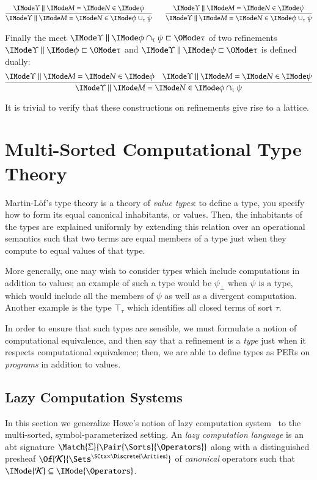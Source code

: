 \documentclass[11pt]{article}
\theoremstyle{definition}
\theoremstyle{notation}
\theoremstyle{remark}
\numberwithin{equation}{section}
\newcommand\IsSubsetEq[2]{\IMode{#1}\subseteq\IMode{#2}}
\newcommand\CanOperators{\mathcal{K}}
\newcommand\TyTop[1]{\top_{#1}}
\newcommand\TyMeet[1]{\cap_{#1}}
\newcommand\TyJoin[1]{\cup_{#1}}
\begin{document}
\begin{gather*}
  \infer{
    \RMemEq{\Upsilon}{M}{N}{\phi\TyJoin{\tau}\psi}
  }{
    \RMemEq{\Upsilon}{M}{N}{\phi}
  }\qquad
  \infer{
    \RMemEq{\Upsilon}{M}{N}{\phi\TyJoin{\tau}\psi}
  }{
    \RMemEq{\Upsilon}{M}{N}{\psi}
  }
\end{gather*}

Finally the meet $\Refines{\Upsilon}{\phi\TyMeet{\tau}\psi}{\tau}$ of two refinements
$\Refines{\Upsilon}{\phi}{\tau}$ and $\Refines{\Upsilon}{\psi}{\tau}$ is defined
dually:
\[
  \infer{
    \RMemEq{\Upsilon}{M}{N}{\phi\TyMeet{\tau}\psi}
  }{
    \RMemEq{\Upsilon}{M}{N}{\phi} &
    \RMemEq{\Upsilon}{M}{N}{\psi}
  }
\]

It is trivial to verify that these constructions on refinements give rise to a
lattice.

\section{Multi-Sorted Computational Type Theory}

Martin-L\"of's type theory is a theory of \emph{value types}: to define a type,
you specify how to form its equal canonical inhabitants, or values. Then, the
inhabitants of the types are explained uniformly by extending this relation
over an operational semantics such that two terms are equal members of a
type just when they compute to equal values of that type.

More generally, one may wish to consider types which include computations in
addition to values; an example of such a type would be $\psi_\bot$ when $\psi$
is a type, which would include all the members of $\psi$ as well as a divergent
computation. Another example is the type $\TyTop{\tau}$ which identifies all
closed terms of sort $\tau$.

In order to ensure that such types are sensible, we must formulate a notion of
computational equivalence, and then say that a refinement is a \emph{type} just
when it respects computational equivalence; then, we are able to define types
as PERs on \emph{programs} in addition to values.


\subsection{Lazy Computation Systems}

In this section we generalize Howe's notion of lazy computation
system~\cite{howe:1989} to the multi-sorted, symbol-parameterized setting. An
\emph{lazy computation language} is an abt signature
$\Match{\Sigma}{\Pair{\Sorts}{\Operators}}$ along with a distinguished
presheaf $\Of{\CanOperators}{\Sets^{\SCtx\times\Discrete{\Arities}}}$ of
\emph{canonical} operators such that $\IsSubsetEq{\CanOperators}{\Operators}$.
\end{document}
